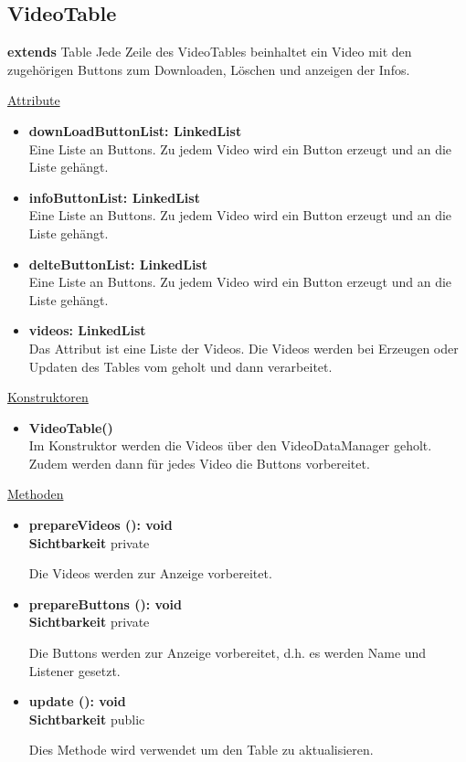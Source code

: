 \newpage
\subsection{VideoTable}\label{VideoTable}
\textbf{extends}  Table \newline
Jede Zeile des VideoTables beinhaltet ein Video mit den zugehörigen Buttons zum Downloaden, Löschen und anzeigen der Infos.

\underline{Attribute}
\begin{itemize}
\itemsep0pt

\item \textbf{downLoadButtonList: LinkedList} \hfill\\ 
Eine Liste an Buttons. Zu jedem Video wird ein Button erzeugt und an die Liste gehängt.

\item \textbf{infoButtonList: LinkedList} \hfill\\ 
Eine Liste an Buttons. Zu jedem Video wird ein Button erzeugt und an die Liste gehängt.

\item \textbf{delteButtonList: LinkedList} \hfill\\ 
Eine Liste an Buttons. Zu jedem Video wird ein Button erzeugt und an die Liste gehängt.

\item \textbf{videos: LinkedList} \hfill\\ 
Das Attribut ist eine Liste der Videos. Die Videos werden bei Erzeugen oder Updaten des Tables vom  geholt und dann verarbeitet.
\end{itemize}

\underline{Konstruktoren}
\begin{itemize}
\itemsep0pt

\item \textbf{VideoTable()} \hfill\\ 
Im Konstruktor werden die Videos über den VideoDataManager geholt. Zudem werden dann für jedes Video die Buttons vorbereitet.

\end{itemize}


\underline{Methoden}
\begin{itemize}
\itemsep0pt

\item \textbf{prepareVideos (): void}\hfill\\
\textbf{Sichtbarkeit} private

Die Videos werden zur Anzeige vorbereitet.

\item \textbf{prepareButtons (): void}\hfill\\
\textbf{Sichtbarkeit} private

Die Buttons werden zur Anzeige vorbereitet, d.h. es werden Name und Listener gesetzt.

\item \textbf{update (): void}\hfill\\
\textbf{Sichtbarkeit} public

Dies Methode wird verwendet um den Table zu aktualisieren.

\end{itemize}
